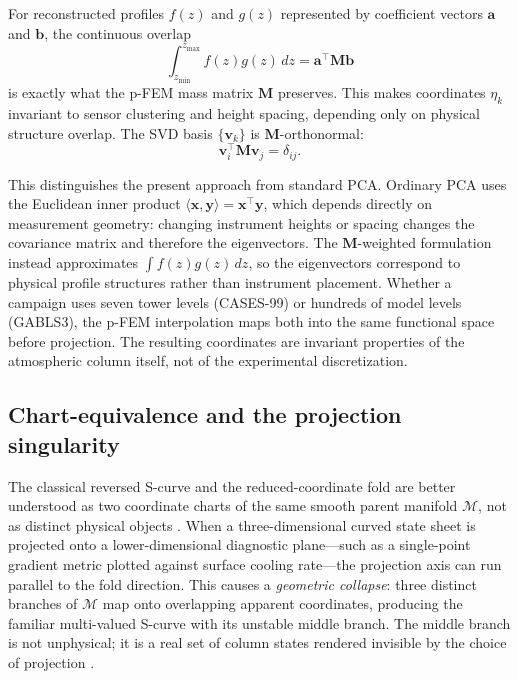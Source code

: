 \documentclass[12pt,a4paper]{article}
\newcommand{\vect}[1]{\mathbf{#1}}
\newcommand{\mat}[1]{\mathbf{#1}}
\begin{document}
For reconstructed profiles $f(z)$ and $g(z)$ represented by coefficient vectors $\vect{a}$ and $\vect{b}$, the continuous overlap
\begin{equation}
\int_{z_{\text{min}}}^{z_{\text{max}}} f(z)g(z)\,dz = \vect{a}^\top \mat{M} \vect{b}
\end{equation}
is exactly what the p-FEM mass matrix $\mat{M}$ preserves. This makes coordinates $\eta_k$ invariant to sensor clustering and height spacing, depending only on physical structure overlap. The SVD basis $\{\vect{v}_k\}$ is $\mat{M}$-orthonormal:
\begin{equation}
\vect{v}_i^\top \mat{M} \vect{v}_j = \delta_{ij}.
\end{equation}

This distinguishes the present approach from standard PCA. Ordinary PCA uses the Euclidean inner product $\langle \vect{x}, \vect{y}\rangle = \vect{x}^\top \vect{y}$, which depends directly on measurement geometry: changing instrument heights or spacing changes the covariance matrix and therefore the eigenvectors. The $\mat{M}$-weighted formulation instead approximates $\int f(z)g(z)\,dz$, so the eigenvectors correspond to physical profile structures rather than instrument placement. Whether a campaign uses seven tower levels (CASES-99) or hundreds of model levels (GABLS3), the p-FEM interpolation maps both into the same functional space before projection. The resulting coordinates are invariant properties of the atmospheric column itself, not of the experimental discretization.

\subsection{Chart-equivalence and the projection singularity}

The classical reversed S-curve and the reduced-coordinate fold are better understood as two coordinate charts of the same smooth parent manifold $\mathcal{M}$, not as distinct physical objects \citep{thom1975, zeeman1977}. When a three-dimensional curved state sheet is projected onto a lower-dimensional diagnostic plane---such as a single-point gradient metric plotted against surface cooling rate---the projection axis can run parallel to the fold direction. This causes a \emph{geometric collapse}: three distinct branches of $\mathcal{M}$ map onto overlapping apparent coordinates, producing the familiar multi-valued S-curve with its unstable middle branch. The middle branch is not unphysical; it is a real set of column states rendered invisible by the choice of projection \citep{poston1978}.
\end{document}
